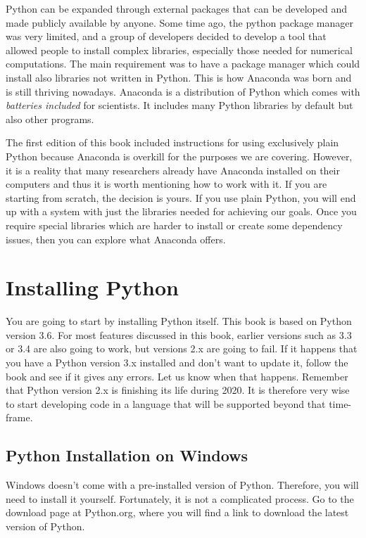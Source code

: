 Python can be expanded through external packages that can be developed and made publicly available by anyone. Some time ago, the python package manager was very limited, and a group of developers decided to develop a tool that allowed people to install complex libraries, especially those needed for numerical computations. The main requirement was to have a package manager which could install also libraries not written in Python. This is how Anaconda was born and is still thriving nowadays. Anaconda is a distribution of Python which comes with \emph{batteries included} for scientists. It includes many Python libraries by default but also other programs. 

The first edition of this book included instructions for using exclusively plain Python because Anaconda is overkill for the purposes we are covering. However, it is a reality that many researchers already have Anaconda installed on their computers and thus it is worth mentioning how to work with it. If you are starting from scratch, the decision is yours. If you use plain Python, you will end up with a system with just the libraries needed for achieving our goals. Once you require special libraries which are harder to install or create some dependency issues, then you can explore what Anaconda offers.

\section{Installing Python}
You are going to start by installing Python itself. This book is based on Python version 3.6. For most features discussed in this book, earlier versions such as 3.3 or 3.4 are also going to work, but versions 2.x are going to fail. If it happens that you have a Python version 3.x installed and don't want to update it, follow the book and see if it gives any errors. Let us know when that happens. Remember that Python version 2.x is finishing its life during 2020. It is therefore very wise to start developing code in a language that will be supported beyond that time-frame. 

\subsection{Python Installation on Windows}
Windows doesn't come with a pre-installed version of Python. Therefore, you will need to install it yourself. Fortunately, it is not a complicated process. Go to the download page at Python.org, where you will find a link to download the latest version of Python.

